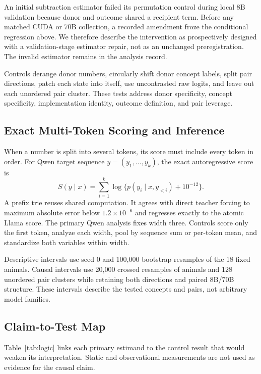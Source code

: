 \documentclass[letterpaper]{article}
\begin{document}
An initial subtraction estimator failed its permutation control during local
8B validation because donor and outcome shared a recipient term. Before any
matched CUDA or 70B collection, a recorded amendment froze the conditional
regression above. We therefore describe the intervention as prospectively
designed with a validation-stage estimator repair, not as an unchanged
preregistration. The invalid estimator remains in the analysis record.

Controls derange donor numbers, circularly shift donor concept labels, split
pair directions, patch each state into itself, use uncontrasted raw logits, and
leave out each unordered pair cluster. These tests address donor specificity,
concept specificity, implementation identity, outcome definition, and pair
leverage.

\subsection{Exact Multi-Token Scoring and Inference}

When a number is split into several tokens, its score must include every token
in order. For Qwen target sequence $y=(y_1,\ldots,y_k)$, the exact
autoregressive score is
\begin{equation}
S(y\mid x)=\sum_{i=1}^{k}\log\{p(y_i\mid x,y_{<i})+10^{-12}\}.
\end{equation}
A prefix trie reuses shared computation. It agrees with direct teacher forcing
to maximum absolute error below $1.2\times10^{-6}$ and regresses exactly to the
atomic Llama score. The primary Qwen analysis fixes width three. Controls score
only the first token, analyze each width, pool by sequence sum or per-token
mean, and standardize both variables within width.

Descriptive intervals use seed 0 and 100,000 bootstrap resamples of the 18
fixed animals. Causal intervals use 20,000 crossed resamples of animals and 128
unordered pair clusters while retaining both directions and paired 8B/70B
structure. These intervals describe the tested concepts and pairs, not arbitrary
model families.

\subsection{Claim-to-Test Map}

Table~\ref{tab:logic} links each primary estimand to the control result that
would weaken its interpretation. Static and observational measurements are not
used as evidence for the causal claim.
\end{document}
